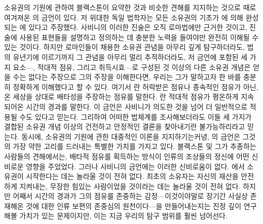 소유권의 기원에 관하여
블랙스톤이 요약한 것과 비슷한 견해를 지지하는 것으로
때로 여겨져온 의 금언이 있다.
저 위대한 독일 법학자는
모든 소유권의 기초가
에 의해 완성되는
에 있다고 주장했다.
사비니의 이러한 진술은 오직 로마법에만 근거한 것이고,
진술에 사용된 표현들을 설명하고 정의하는 데 충분한 노력을 들여야만
완전히 이해될 수 있는 것이다.
하지만
로마인들이 채용한 소유권 관념을 아무리 깊게 탐구하더라도,
법의 유년기에 이르기까지 그 관념을 아무리 멀리 추적하더라도,
저 금언에 포함된 세 가지 요소---, 적대적 점유, 그리고 취득시효---로
구성된 것 이상의
다른 소유권 개념은
얻을 수는 없다는 주장으로
그의 주장을
이해한다면,
우리는 그가 말하고자 한 바를 충분히 정확하게 이해했다고 할 수 있다.
여기서
란 허락받은 점유나 종속적인 점유가 아닌,
온 세상을 상대로 배타성을 주장하는 점유를 말한다.
란 적대적 점유가 평온하게 지속되어온 시간의 경과를 말한다.
이 금언은 사비니가 의도한 것을 넘어 더 일반적으로 적용될 수도 있다고 믿는다.
그리하여 어떠한 법체계를 조사해보더라도
이들 세 가지가 결합된 소유권 개념 이상의
건전하고 안정적인 결론을 찾아내기란 불가능하리라고 믿는다.
동시에,
소유권의 기원에 관한 대중적인 이론을 지지하기는커녕,
의 금언은 그것의 가장 약한 고리를 드러내는 특별한 가치를 가지고 있다.
블랙스톤 및 그가 추종하는 사람들의 견해에서는,
배타적 점유를 획득하는 방식이
인류의 조상들의 정신에 어떤 신비로운 영향을 주었었다.
그러나 사비니의 금언에는 이러한 신비로움이 없다.
에서 소유권이 시작한다는 데는 놀라울 것이 전혀 없다.
최초의 소유자는 자신의 재산을 안전하게 지켜내는,
무장한 힘있는 사람이었을
것이라는 데는 놀라울 것이 전혀 없다.
하지만 어째서 시간의 경과가 그의 점유를 존중하는 감정---이것이야말로
장기간 사실상 존재해온 것에 대한 인류 보편의 존중심의
원천이다---을 만들어내는지는
진정 깊이 연구해볼 가치가 있는 문제이지만,
이는 지금 우리의 탐구 범위를 훨씬 넘어선다.

